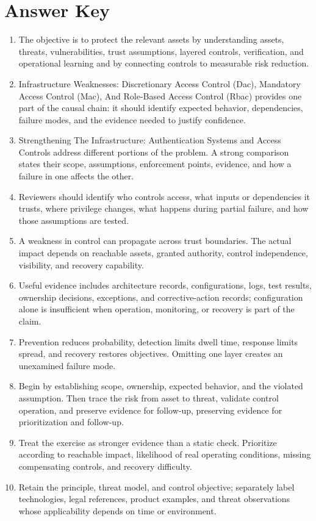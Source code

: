 \documentclass[11pt]{article}
\begin{document}
\section*{Answer Key}
\begin{enumerate}
\item The objective is to protect the relevant assets by understanding assets, threats, vulnerabilities, trust assumptions, layered controls, verification, and operational learning and by connecting controls to measurable risk reduction.
\item Infrastructure Weaknesses: Discretionary Access Control (Dac), Mandatory Access Control (Mac), And Role-Based Access Control (Rbac) provides one part of the causal chain: it should identify expected behavior, dependencies, failure modes, and the evidence needed to justify confidence.
\item Strengthening The Infrastructure: Authentication Systems and Access Controls address different portions of the problem. A strong comparison states their scope, assumptions, enforcement points, evidence, and how a failure in one affects the other.
\item Reviewers should identify who controls access, what inputs or dependencies it trusts, where privilege changes, what happens during partial failure, and how those assumptions are tested.
\item A weakness in control can propagate across trust boundaries. The actual impact depends on reachable assets, granted authority, control independence, visibility, and recovery capability.
\item Useful evidence includes architecture records, configurations, logs, test results, ownership decisions, exceptions, and corrective-action records; configuration alone is insufficient when operation, monitoring, or recovery is part of the claim.
\item Prevention reduces probability, detection limits dwell time, response limits spread, and recovery restores objectives. Omitting one layer creates an unexamined failure mode.
\item Begin by establishing scope, ownership, expected behavior, and the violated assumption. Then trace the risk from asset to threat, validate control operation, and preserve evidence for follow-up, preserving evidence for prioritization and follow-up.
\item Treat the exercise as stronger evidence than a static check. Prioritize according to reachable impact, likelihood of real operating conditions, missing compensating controls, and recovery difficulty.
\item Retain the principle, threat model, and control objective; separately label technologies, legal references, product examples, and threat observations whose applicability depends on time or environment.
\end{enumerate}
\end{document}
